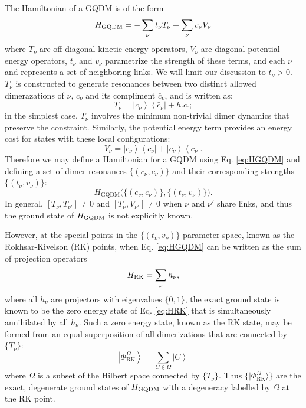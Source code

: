 \documentclass[twocolumn,prb,aps,floatfix,superscriptaddress]{revtex4-1}
\newcommand{\ket}[1]{| #1 \rangle}
\newcommand{\eket}[1]{\left | #1 \right \rangle}
\newcommand{\ebra}[1]{\left \langle #1 \right |}
\newcommand{\Eqref}[1]{Eq. \eqref{#1}}
\newcommand{\RK}{\mathrm{RK}}
\newcommand{\HGQDM}{H_\mathrm{GQDM}}
\begin{document}
The Hamiltonian of a GQDM is of the form
\begin{equation}
H_{\rm{GQDM}} = -\sum_\nu t_\nu  {T}_{\nu} + \sum_\nu v_\nu  {V}_{\nu} \label{eq:HGQDM}
\end{equation}
where ${T}_\nu$ are off-diagonal kinetic energy operators, ${V}_\nu$ are diagonal potential energy operators, $t_\nu$ and $v_\nu$ parametrize the strength of these terms, and each $\nu$ and represents a set of  neighboring links. We will limit our discussion to $t_\nu >0$. ${T}_\nu$ is constructed to generate resonances between two distinct allowed dimerazations of $\nu$, $c_\nu$ and its compliment $\bar{c}_\nu$, and is written as:
\begin{equation}
 {T}_{\nu} = \eket{c_\nu}\ebra{\bar{c}_\nu} + h.c.;
\end{equation}
in the simplest case, $ {T_\nu}$ involves the minimum non-trivial dimer dynamics that preserve the constraint. Similarly, the potential energy term provides an energy cost for states with these local configurations:
\begin{equation}
 {V}_{\nu} = \eket{c_\nu}\ebra{c_\nu} +  \eket{\bar{c}_\nu}\ebra{\bar{c}_\nu}.
\end{equation}
Therefore we may define a Hamiltonian for a GQDM using \Eqref{eq:HGQDM} and defining a set of dimer resonances $\{(c_\nu,\bar{c}_\nu)\}$ and their corresponding strengths $\{(t_\nu,v_\nu)\}$:
\begin{equation}
\HGQDM \biggl( \bigl\{\left(c_\nu,\bar{c}_\nu\right)\},\{\left(t_\nu,v_\nu\right)\bigr\}\biggr).
\end{equation}
 In general, $[T_\nu, T_{\nu'}] \neq 0 $ and $[T_\nu,V_{\nu'}]\neq0$ when $\nu$ and $\nu'$ share links, and thus the ground state of $H_{\rm{GQDM}}$ is not explicitly known.

However, at the special points in the $\{(t_\nu,v_\nu)\}$ parameter space, known as the Rokhsar-Kivelson (RK) points, when \Eqref{eq:HGQDM} can be written as the sum of projection operators
\begin{equation}
H_{\rm{RK}} = \sum_\nu  {h}_\nu \label{eq:HRK},
\end{equation}
where all $h_\nu$ are projectors with eigenvalues $\{0,1\}$, the exact ground state is known to be
the zero energy state of \Eqref{eq:HRK} that is simultaneously annihilated by all ${\bar{h}}_\nu$. Such a zero energy state, known as the RK state, may be formed from an equal superposition of all dimerizations that are connected by $\{T_\nu\}$:
\begin{equation}
\eket{\Phi_{\RK}^{\Omega}} = \sum_{C \in \Omega} \eket{C}
\end{equation} 
where $\Omega$ is a subset of the Hilbert space connected by $\{T_\nu\}$. Thus $\{ \ket{\Phi_{\RK}^\Omega} \}$ are the exact, degenerate ground states of $H_{\rm{GQDM}}$ with a degeneracy labelled by $\Omega$ at the RK point.
\end{document}
